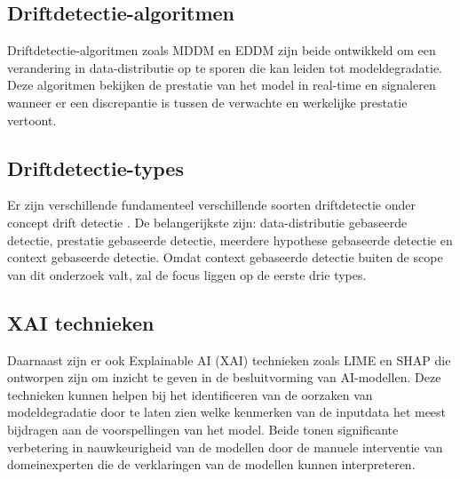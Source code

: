 \subsection{Driftdetectie-algoritmen}
Driftdetectie-algoritmen zoals MDDM \autocite{Pesaranghader2018} en EDDM \autocite{baena2006early} zijn beide ontwikkeld om een verandering in data-distributie op te sporen die kan leiden tot modeldegradatie. Deze algoritmen bekijken de prestatie van het model in real-time en signaleren wanneer er een discrepantie is tussen de verwachte en werkelijke prestatie vertoont.

\subsection{Driftdetectie-types}
Er zijn verschillende fundamenteel verschillende soorten driftdetectie onder concept drift detectie \autocite{Bayram2022}. De belangerijkste zijn: data-distributie gebaseerde detectie, prestatie gebaseerde detectie, meerdere hypothese gebaseerde detectie en context gebaseerde detectie. Omdat context gebaseerde detectie buiten de scope van dit onderzoek valt, zal de focus liggen op de eerste drie types.


\subsection{XAI technieken}
Daarnaast zijn er ook Explainable AI (XAI) technieken zoals LIME \autocite{garreau2020explaining} en SHAP \autocite{VandenBroeck2022} die ontworpen zijn om inzicht te geven in de besluitvorming van AI-modellen. Deze technieken kunnen helpen bij het identificeren van de oorzaken van modeldegradatie door te laten zien welke kenmerken van de inputdata het meest bijdragen aan de voorspellingen van het model. Beide tonen significante verbetering in nauwkeurigheid van de modellen door de manuele interventie van domeinexperten die de verklaringen van de modellen kunnen interpreteren.



